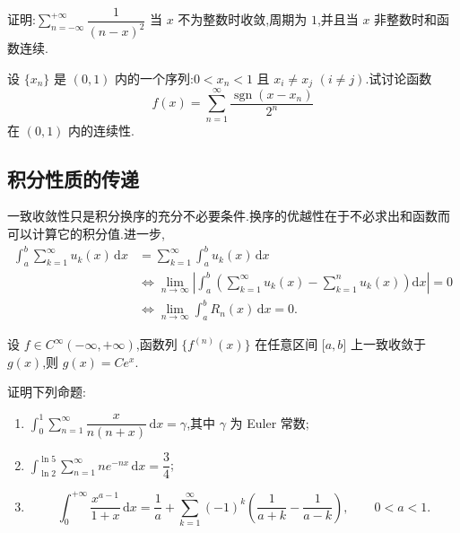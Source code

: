 \documentclass[../数学分析培优讲义.tex]{subfiles}
\begin{document}
\begin{example}
证明:$\displaystyle\sum\limits_{n=-\infty}^{+\infty}\dfrac{1}{(n-x)^2}$ 当 $x$ 不为整数时收敛,周期为 $1$,并且当 $x$ 非整数时和函数连续.
\end{example}
\exampleblank

\begin{example}[\markstar]
设 $\{x_n\}$ 是 $(0,1)$ 内的一个序列:$0<x_n<1$ 且 $x_i\neq x_j$ $(i\neq j)$.试讨论函数
\[
    f(x)=\sum\limits_{n=1}^{\infty}\dfrac{\operatorname{sgn}(x-x_n)}{2^n}
\]
在 $(0,1)$ 内的连续性.
\end{example}
\exampleblank


\newpage

\subsection{积分性质的传递}

一致收敛性只是积分换序的充分不必要条件.换序的优越性在于不必求出和函数而可以计算它的积分值.进一步,
\[
\begin{aligned}
    \int_a^b\sum\limits_{k=1}^{\infty}u_k(x)\,\mathrm{d}x
    &=\sum\limits_{k=1}^{\infty}\int_a^b u_k(x)\,\mathrm{d}x\\
    &\iff \lim\limits_{n\to\infty}\left|\int_a^b\left(\sum\limits_{k=1}^{\infty}u_k(x)-\sum\limits_{k=1}^{n}u_k(x)\right)\mathrm{d}x\right|=0\\
    &\iff \lim\limits_{n\to\infty}\int_a^bR_n(x)\,\mathrm{d}x=0.
\end{aligned}
\]

\begin{example}
设 $f\in C^{\infty}(-\infty,+\infty)$,函数列 $\{f^{(n)}(x)\}$ 在任意区间 $\lbrack a,b\rbrack$ 上一致收敛于 $g(x)$,则 $g(x)=Ce^x$.
\end{example}
\exampleblank

\begin{example}
证明下列命题:
\begin{enumerate}[label=(\arabic*)]
    \item $\displaystyle\int_0^1\sum\limits_{n=1}^{\infty}\dfrac{x}{n(n+x)}\,\mathrm{d}x=\gamma$,其中 $\gamma$ 为 Euler 常数;
    \item $\displaystyle\int_{\ln2}^{\ln5}\sum\limits_{n=1}^{\infty}ne^{-nx}\,\mathrm{d}x=\dfrac{3}{4}$;
    \item
    \[
        \int_0^{+\infty}\dfrac{x^{a-1}}{1+x}\,\mathrm{d}x
        =\dfrac{1}{a}+\sum\limits_{k=1}^{\infty}(-1)^k
        \left(\dfrac{1}{a+k}-\dfrac{1}{a-k}\right),
        \qquad 0<a<1.
    \]
\end{enumerate}
\end{example}
\exampleblank
\end{document}

